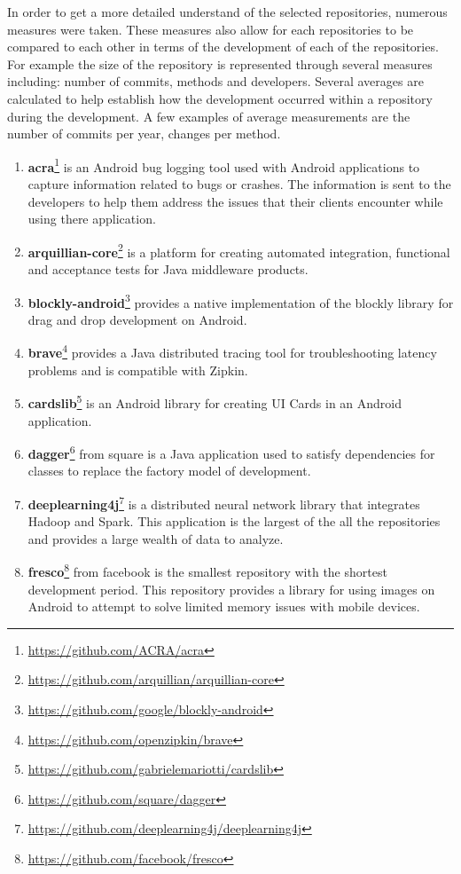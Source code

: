 In order to get a more detailed understand of the selected repositories, numerous measures were taken. These measures also allow for each repositories to be compared to each other in terms of the development of each of the repositories. For example the size of the repository is represented through several measures including: number of commits, methods and developers. Several averages are calculated to help establish how the development occurred within a repository during the development. A few examples of average measurements are the number of commits per year, changes per method.

\begin{enumerate}
\item \textbf{acra}\footnote{\url{https://github.com/ACRA/acra}} is an Android bug logging tool used with Android applications to capture information related to bugs or crashes. The information is sent to the developers to help them address the issues that their clients encounter while using there application.
\item \textbf{arquillian-core}\footnote{\url{https://github.com/arquillian/arquillian-core}} is a platform for creating automated integration, functional and acceptance tests for Java middleware products. 
\item \textbf{blockly-android}\footnote{\url{https://github.com/google/blockly-android}} provides a native implementation of the blockly library for drag and drop development on Android. 
\item \textbf{brave}\footnote{\url{https://github.com/openzipkin/brave}} provides a Java distributed tracing tool for troubleshooting latency problems and is compatible with Zipkin.
\item \textbf{cardslib}\footnote{\url{https://github.com/gabrielemariotti/cardslib}} is an Android library for creating UI Cards in an Android application.
\item \textbf{dagger}\footnote{\url{https://github.com/square/dagger}} from square is a Java application used to satisfy dependencies for classes to replace the factory model of development.
\item \textbf{deeplearning4j}\footnote{\url{https://github.com/deeplearning4j/deeplearning4j}} is a distributed neural network library that integrates Hadoop and Spark. This application is the largest of the all the repositories and provides a large wealth of data to analyze.
\item \textbf{fresco}\footnote{\url{https://github.com/facebook/fresco}} from facebook is the smallest repository with the shortest development period. This repository provides a library for using images on Android to attempt to solve limited memory issues with mobile devices.

\end{enumerate}
